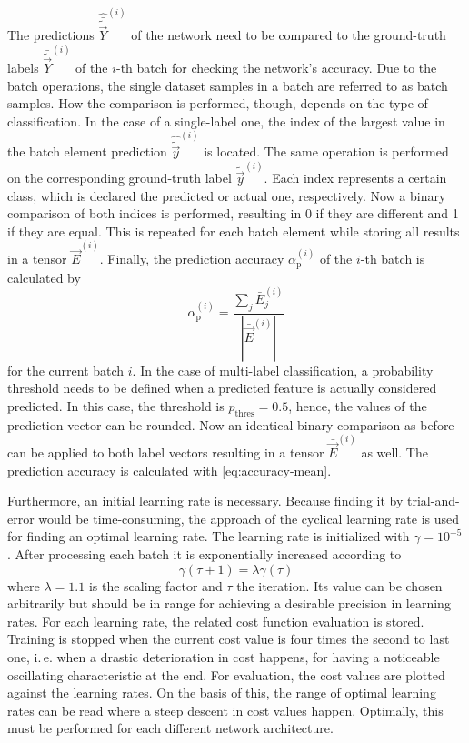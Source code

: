 The predictions $\hat{\bar{\tilde{\vec{Y}}}}^{(i)}$ of the network need to be compared to the ground-truth labels $\bar{\tilde{\vec{Y}}}^{(i)}$ of the $i$-th batch for checking the network's accuracy.
Due to the batch operations, the single dataset samples in a batch are referred to as batch samples.
How the comparison is performed, though, depends on the type of classification.
In the case of a single-label one, the index of the largest value in the batch element prediction $\hat{\tilde{\vec{y}}}^{(i)}$ is located.
The same operation is performed on the corresponding ground-truth label $\tilde{\vec{y}}^{(i)}$.
Each index represents a certain class, which is declared the predicted or actual one, respectively.
Now a binary comparison of both indices is performed, resulting in 0 if they are different and 1 if they are equal.
This is repeated for each batch element while storing all results in a tensor $\bar{\vec{E}}^{(i)}$.
Finally, the prediction accuracy $\alpha_{\text{p}}^{(i)}$ of the $i$-th batch is calculated by
\begin{equation}
	\label{eq:accuracy-mean}
	\alpha_{\text{p}}^{(i)} = \frac{\sum_{j} \bar{E}_j^{(i)}}{\left|\bar{\vec{E}}^{(i)}\right|}
\end{equation}
for the current batch $i$.
In the case of multi-label classification, a probability threshold needs to be defined when a predicted feature is actually considered predicted.
In this case, the threshold is $p_{\text{thres}}=0.5$, hence, the values of the prediction vector can be rounded.
Now an identical binary comparison as before can be applied to both label vectors resulting in a tensor $\bar{\vec{E}}^{(i)}$ as well.
The prediction accuracy is calculated with \eqref{eq:accuracy-mean}.

Furthermore, an initial learning rate is necessary.
Because finding it by trial-and-error would be time-consuming, the approach of the cyclical learning rate is used for finding an optimal learning rate.
The learning rate is initialized with $\gamma = 10^{-5}$.
After processing each batch it is exponentially increased according to
\begin{equation}
	\gamma(\tau+1) = \lambda \gamma(\tau)
\end{equation}
where $\lambda = 1.1$ is the scaling factor and $\tau$ the iteration.
Its value can be chosen arbitrarily but should be in range for achieving a desirable precision in learning rates.
For each learning rate, the related cost function evaluation is stored.
Training is stopped when the current cost value is four times the second to last one, i.\,e. when a drastic deterioration in cost happens, for having a noticeable oscillating characteristic at the end.
For evaluation, the cost values are plotted against the learning rates.
On the basis of this, the range of optimal learning rates can be read where a steep descent in cost values happen.
Optimally, this must be performed for each different network architecture.